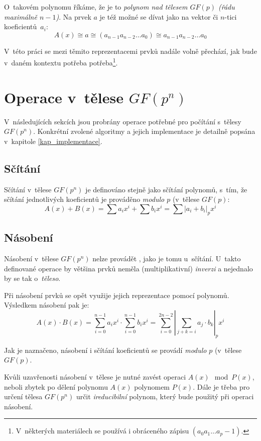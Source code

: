 \documentclass[thesis=M,czech,hidelinks]{FITthesis}[2012/06/26]
\begin{document}
O~takovém polynomu říkáme, že je to \emph{polynom nad tělesem $GF(p)$ (řádu
maximálně $n-1$)}. Na prvek $a$ je též možné se dívat jako na vektor či $n$-tici
koeficientů~$a_i$:
$$ A(x) \cong a \cong (a_{n-1} a_{n-2} \ldots a_0) \cong a_{n-1} a_{n-2} \ldots a_0 $$

V~této práci se mezi těmito reprezentacemi prvků nadále volně přechází, jak
bude v~daném kontextu potřeba potřeba\footnote{
V~některých materiálech se používá i obráceného zápisu $(a_0 a_1 \ldots a_p-1)$.
}.

\section{Operace v~tělese $GF(p^n)$}
V~následujících sekcích jsou probrány operace potřebné pro počítání
s~tělesy $GF(p^n)$. Konkrétní zvolené algoritmy a jejich implementace
je detailně popsána v~kapitole \ref{kap_implementace}.

\subsection{Sčítání}
Sčítání v~tělese $GF(p^n)$ je definováno stejně jako sčítání polynomů, s~tím, že
sčítání jednotlivých koeficientů je prováděno \emph{modulo $p$} (v~tělese $GF(p)$:
$$ A(x) + B(x) = \sum a_i x^i + \sum b_i x^i = \sum \left|a_i + b_i\right|_p x^i $$


\subsection{Násobení}
Násobení v~tělese $GF(p^n)$ nelze provádět , jako je tomu
u~sčítání. U~takto definované operace by většina prvků neměla (multiplikativní)
\emph{inverzi} a nejednalo by se tak o~\emph{těleso}.

Při násobení prvků se opět využije jejich reprezentace pomocí polynomů.
Výsledkem násobení pak je:
$$ A(x) \cdot B(x) = \sum_{i=0}^{n-1} a_i x^i \cdot \sum_{i=0}^{n-1} b_i x^i =
\sum_{i=0}^{2n-2} \left|\sum_{j+k=i} a_j \cdot b_k\right|_p x^i$$

Jak je naznačeno, násobení i sčítání koeficientů se provádí \emph{modulo} $p$
(v~tělese $GF(p)$.

Kvůli uzavřenosti násobení v~tělese je nutné zavést operaci $A(x) \mod P(x)$,
neboli zbytek po dělení polynomu $A(x)$ polynomem $P(x)$. Dále je třeba pro
určení tělesa $GF(p^n)$ určit \emph{ireducibilní} polynom, který bude použitý
při operaci násobení.
\end{document}
